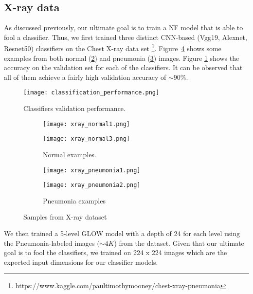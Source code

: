 \subsection{X-ray data}

As discussed previously, our ultimate goal is to train a NF model that is able to fool a classifier. Thus, we first trained three distinct CNN-based (Vgg19, Alexnet, Resnet50) classifiers on the Chest X-ray data set \footnote{https://www.kaggle.com/paultimothymooney/chest-xray-pneumonia}. Figure~\ref{fig:x_rays} shows some examples from both normal (\ref{fig:normal}) and pneumonia (\ref{fig:pneumonia}) images. Figure \ref{fig:classifiers_performance} shows the accuracy on the validation set for each of the classifiers. It can be observed that all of them achieve a fairly high validation accuracy of $\sim 90\%$.
    \begin{figure}
        \centering
        \texttt{[image: classification\_performance.png]}
        \caption{Classifiers validation performance.}
        \label{fig:classifiers_performance}
    \end{figure}
\begin{figure}[htbp!]
     \centering
     \begin{subfigure}[b]{0.3\textwidth}
         \centering
         \texttt{[image: xray\_normal1.png]}
     \end{subfigure} 
     \hfill
     \begin{subfigure}[b]{0.3\textwidth}
         \centering
         \texttt{[image: xray\_normal3.png]}
         \caption{Normal examples.}
         \label{fig:normal}
     \end{subfigure}
     \hfill
     \begin{subfigure}[b]{0.3\textwidth}
         \centering
         \texttt{[image: xray\_pneumonia1.png]}
     \end{subfigure} 
     \hfill
     \begin{subfigure}[b]{0.3\textwidth}
         \centering
         \texttt{[image: xray\_pneumonia2.png]}
         \caption{Pneumonia examples}
         \label{fig:pneumonia}
     \end{subfigure}
     \hfill
     \caption{Samples from X-ray dataset}
     \label{fig:x_rays}
\end{figure}

We then trained a 5-level GLOW model with a depth of 24 for each level using the Pneumonia-labeled images ($\sim 4K$) from the dataset. Given that our ultimate goal is to fool the classifiers, we trained on 224 x 224 images which are the expected input dimensions for our classifier models. 

